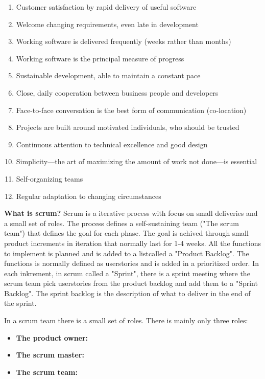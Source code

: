 \begin{enumerate}
    \item Customer satisfaction by rapid delivery of useful software
    \item Welcome changing requirements, even late in development
    \item Working software is delivered frequently (weeks rather than months)
    \item Working software is the principal measure of progress
    \item Sustainable development, able to maintain a constant pace
    \item Close, daily cooperation between business people and developers
    \item Face-to-face conversation is the best form of communication (co-location)
    \item Projects are built around motivated individuals, who should be trusted
    \item Continuous attention to technical excellence and good design
    \item Simplicity—the art of maximizing the amount of work not done—is essential
    \item Self-organizing teams
    \item Regular adaptation to changing circumstances
\end{enumerate}


{\bf What is scrum? } Scrum is a iterative process with focus on small deliveries and a small set of roles. 
The process defines a self-sustaining team ("The scrum team") that defines the goal for each phase. The goal 
is achived through small product increments in iteration that normally last for 1-4 weeks. 
All the functions to implement is planned and is added to a listcalled a "Product Backlog". The
functions is normally defined as userstories and is added in a prioritized order. In each inkrement, 
in scrum called a "Sprint", there is a sprint meeting where the scrum team pick userstories from the 
product backlog and add them to a "Sprint Backlog". The sprint backlog is the description of what 
to deliver in the end of the sprint.

In a scrum team there is a small set of roles. There is mainly only three roles: 
\begin{itemize}
    \item {\bf The product owner: }
    \item {\bf The scrum master: }
    \item {\bf The scrum team: }
\end{itemize}

